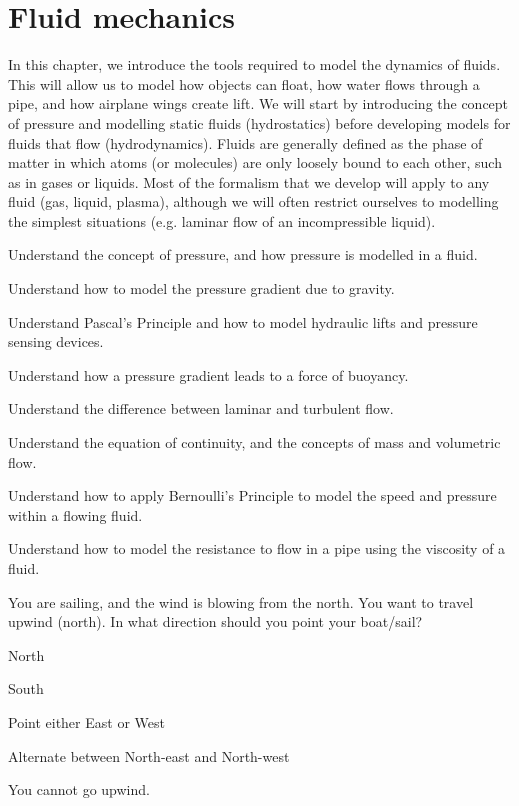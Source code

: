 \chapter{Fluid mechanics}
\label{chapter:fluidmechanics}
In this chapter, we introduce the tools required to model the dynamics of fluids. This will allow us to model how objects can float, how water flows through a pipe, and how airplane wings create lift. We will start by introducing the concept of pressure and modelling static fluids (hydrostatics) before developing models for fluids that flow (hydrodynamics). Fluids are generally defined as the phase of matter in which atoms (or molecules) are only loosely bound to each other, such as in gases or liquids.  Most of the formalism that we develop will apply to any fluid (gas, liquid, plasma), although we will often restrict ourselves to modelling the simplest situations (e.g. laminar flow of an incompressible liquid).

\begin{learningObjectives}{
 \item Understand the concept of pressure, and how pressure is modelled in a fluid.
 \item Understand how to model the pressure gradient due to gravity.
 \item Understand Pascal's Principle and how to model hydraulic lifts and pressure sensing devices.
 \item Understand how a pressure gradient leads to a force of buoyancy.
 \item Understand the difference between laminar and turbulent flow.
 \item Understand the equation of continuity, and the concepts of mass and volumetric flow.
 \item Understand how to apply Bernoulli's Principle to model the speed and pressure within a flowing fluid.
 \item Understand how to model the resistance to flow in a pipe using the viscosity of a fluid.
 }
\end{learningObjectives}

\begin{opening}
\begin{MCquestion}{You are sailing, and the wind is blowing from the north. You want to travel upwind (north). In what direction should you point your boat/sail?
}
\item North
\item South
\item Point either East or West
\item Alternate between North-east and North-west \correct
\item You cannot go upwind.
\end{MCquestion}
\end{opening}

